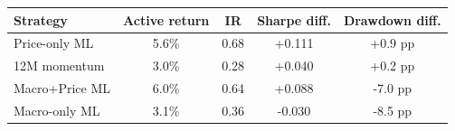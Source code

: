 \begin{tabular}{lcccc}
\toprule
\textbf{Strategy} & \textbf{Active return} & \textbf{IR} & \textbf{Sharpe diff.} & \textbf{Drawdown diff.} \\
\midrule
Price-only ML & 5.6\% & 0.68 & +0.111 & +0.9 pp \\
12M momentum & 3.0\% & 0.28 & +0.040 & +0.2 pp \\
Macro+Price ML & 6.0\% & 0.64 & +0.088 & -7.0 pp \\
Macro-only ML & 3.1\% & 0.36 & -0.030 & -8.5 pp \\
\bottomrule
\end{tabular}